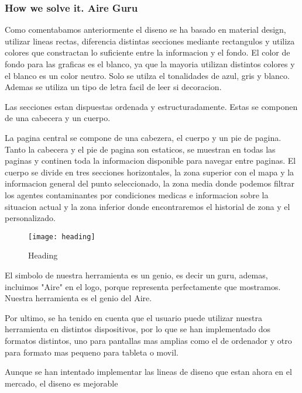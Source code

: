\subsubsection{How we solve it. Aire Guru} 
Como comentabamos anteriormente el diseno se ha basado en material design, utilizar lineas rectas, diferencia
distintas secciones mediante rectangulos y utiliza colores que constractan lo suficiente entre la informacion y el fondo.
El color de fondo para las graficas es el blanco, ya que la mayoria utilizan distintos colores y el blanco es un color 
neutro. Solo se utilza el tonalidades de azul, gris y blanco. Ademas se utiliza un tipo de letra facil de leer si decoracion.

Las secciones estan dispuestas ordenada y estructuradamente. Estas  se componen de una cabecera y un cuerpo. 

La pagina central se compone de una cabezera, el cuerpo y un pie de pagina. Tanto la cabecera y el pie de pagina son estaticos,
se muestran en todas las paginas y continen toda la informacion disponible para navegar entre paginas.
El cuerpo se divide en tres secciones horizontales, la zona superior con el mapa y la informacion general del punto seleccionado,
la zona media donde podemos filtrar los agentes contaminantes por condiciones medicas e informacion sobre la situacion actual y la 
zona inferior donde encontraremos el historial de zona y el personalizado.

\begin{figure}[ht]
    \centering
    \texttt{[image: heading]}
    \caption{Heading}
\end{figure}



El simbolo de nuestra herramienta es un genio, es decir un guru, ademas, incluimos "Aire" en el logo, porque representa perfectamente
que mostramos. Nuestra herramienta es el genio del Aire.

Por ultimo, se ha tenido en cuenta que el usuario puede utilizar nuestra herramienta en distintos dispositivos, por lo que se han implementado 
dos formatos distintos, uno para pantallas mas amplias como el de ordenador y otro para formato mas pequeno para tableta o movil.


\begin{itemize}
    \done
    \crossed
    \crossed Aunque se han intentado implementar las lineas de diseno que estan ahora en el mercado, el diseno es mejorable
\end{itemize}

\newpage